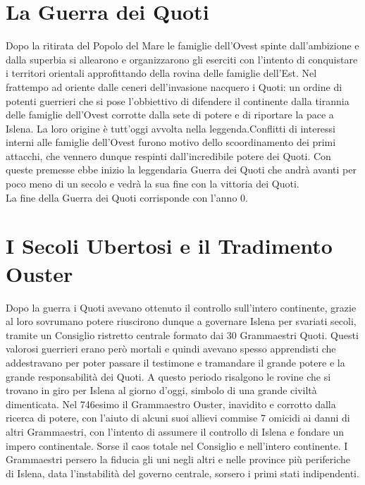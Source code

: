 \documentclass[a4paper]{report}
\begin{document}
\begin{multicols}{2}
\section*{La Guerra dei Quoti}
Dopo la ritirata del Popolo del Mare le famiglie dell’Ovest spinte dall’ambizione e dalla superbia si allearono e organizzarono gli eserciti con l’intento di conquistare i territori orientali approfittando della rovina delle famiglie dell’Est. Nel frattempo ad oriente dalle ceneri dell’invasione nacquero i Quoti: un ordine di potenti guerrieri che si pose l’obbiettivo di difendere il continente dalla tirannia delle famiglie dell’Ovest corrotte dalla sete di potere e di riportare la pace a Islena. La loro origine è tutt’oggi avvolta nella leggenda.Conflitti di interessi interni alle famiglie dell’Ovest furono motivo dello scoordinamento dei primi attacchi, che vennero dunque respinti dall’incredibile potere dei Quoti. Con queste premesse ebbe inizio la leggendaria Guerra dei Quoti che andrà avanti per poco meno di un secolo e vedrà la sua fine con la vittoria dei Quoti.\\
La fine della Guerra dei Quoti corrisponde con l’anno 0.
\section*{I Secoli Ubertosi e il Tradimento Ouster}
Dopo la guerra i Quoti avevano ottenuto il controllo sull’intero continente, grazie al loro sovrumano potere riuscirono dunque a governare Islena per svariati secoli, tramite un Consiglio ristretto centrale formato dai 30 Grammaestri Quoti. Questi valorosi guerrieri erano però mortali e quindi avevano spesso apprendisti che addestravano per poter passare il testimone e tramandare il grande potere e la grande responsabilità dei Quoti. A questo periodo risalgono le rovine che si trovano in giro per Islena al giorno d’oggi, simbolo di una grande civiltà dimenticata. Nel 746esimo il Grammaestro Ouster, inavidito e corrotto dalla ricerca di potere, con l’aiuto di alcuni suoi allievi commise 7 omicidi ai danni di altri Grammaestri, con l’intento di assumere il controllo di Islena e fondare un impero continentale. Sorse il caos totale nel Consiglio e nell’intero continente. I Grammaestri persero la fiducia gli uni negli altri e nelle province più periferiche di Islena, data l’instabilità del governo centrale, sorsero i primi stati indipendenti.

\end{multicols}
\end{document}
